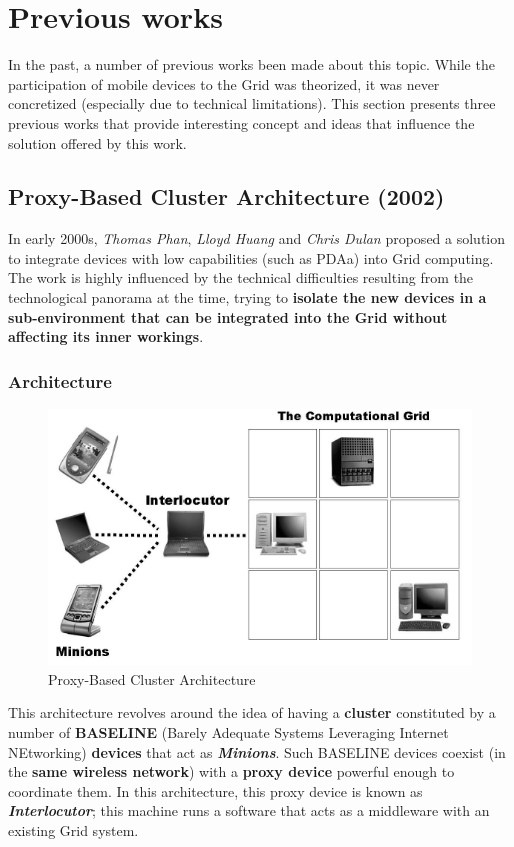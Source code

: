 \section{Previous works}
In the past, a number of previous works been made about this topic. While the participation of mobile devices to the Grid was theorized, it was never concretized (especially due to technical limitations). This section presents three previous works that provide interesting concept and ideas that influence the solution offered by this work.

\subsection{Proxy-Based Cluster Architecture (2002)}
In early 2000s, \textit{Thomas Phan}, \textit{Lloyd Huang} and \textit{Chris Dulan} proposed a solution to integrate devices with low capabilities (such as PDAa) into Grid computing. The work is highly influenced by the technical difficulties resulting from the technological panorama at the time, trying to \textbf{isolate the new devices in a sub-environment that can be integrated into the Grid without affecting its inner workings}.

\subsubsection{Architecture}
\begin{figure}[H]
    \centering
    \includegraphics[scale=0.9]{document/chapters/chapter_3/images/2002_architecture.png}
    \caption{Proxy-Based Cluster Architecture \cite{integrating_mobile_devices_into_grid}}
    \label{fig:2002_architecture}
\end{figure}
This architecture revolves around the idea of having a \textbf{cluster} constituted by a number of \textbf{BASELINE} (Barely Adequate Systems Leveraging Internet NEtworking) \textbf{devices} that act as \textbf{\textit{Minions}}. Such BASELINE devices coexist (in the \textbf{same wireless network}) with a \textbf{proxy device} powerful enough to coordinate them. In this architecture, this proxy device is known as \textbf{\textit{Interlocutor}}; this machine runs a software that acts as a middleware with an existing Grid system.

